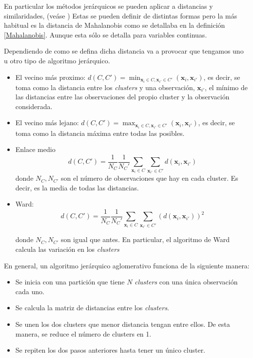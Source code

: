 \noindent En particular los métodos jerárquicos se pueden aplicar a distancias y similaridades, (veáse \cite{Mardia 1979}) Estas se pueden definir de distintas formas pero la más habitual es la distancia de Mahalanobis como se detallaba en la definición \ref{Mahalanobis}. Aunque esta sólo se detalla para variables continuas. 

\noindent Dependiendo de como se defina dicha distancia va a provocar que tengamos uno u otro tipo de algoritmo jerárquico.\cite{Everitt 2011, Johnson 2007, Peña 2002}
\begin{itemize}
\item El vecino más proximo: $d(C,C')=\min_{\mathbf{x}_i\in C, \mathbf{x}_{i'}\in C'}(\mathbf{x}_i,\mathbf{x}_{i'})$, es decir, se toma como la distancia entre los \emph{clusters} y una observación, $\mathbf{x}_{i'}$, el mínimo de las distancias entre las observaciones del propio cluster y la observación considerada.
\item El vecino más lejano: $d(C,C')=\max_{\mathbf{x}_i\in C, \mathbf{x}_{i'}\in C'}(\mathbf{x}_i,\mathbf{x}_{i'})$, es decir, se toma como la distancia máxima entre todas las posibles. 
\item Enlace medio \begin{equation}
d(C,C')=\dfrac{1}{N_C}\dfrac{1}{N_C'}\sum_{\mathbf{x}_i\in C}\sum_{\mathbf{x}_{i'}\in C'} d(\mathbf{x}_i, \mathbf{x}_{i'})
\end{equation}
donde $N_C, N_{C'}$ son el número de observaciones que hay en cada cluster. Es decir, es la media de todas las distancias. 
\item Ward:
\begin{equation}
d(C,C')=\dfrac{1}{N_C}\dfrac{1}{N_C'}\sum_{\mathbf{x}_i\in C}\sum_{\mathbf{x}_{i'}\in C'} (d(\mathbf{x}_i, \mathbf{x}_{i'}))^2
\end{equation} 

donde $N_C, N_{C'}$ son igual que antes. En particular, el algoritmo de Ward calcula las variación en los \emph{clusters}
\end{itemize}

\noindent En general, un algoritmo jerárquico aglomerativo funciona de la siguiente manera:

\begin{itemize}
\item Se inicia con una partición que tiene $N$ \emph{clusters} con una única observación cada uno.
\item Se calcula la matriz de distancias entre los \emph{clusters}. 
\item Se unen los dos clusters que menor distancia tengan entre ellos. De esta manera, se reduce el número de clusters en 1.  
\item Se repiten los dos pasos anteriores hasta tener un único cluster. 
\end{itemize}

